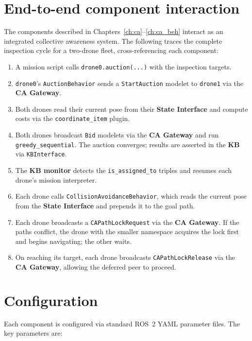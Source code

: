 \documentclass[deliverable]{csreport}
\renewcommand{\code}[1]{\texttt{\textcolor{CSMaroon}{#1}}}%
\begin{document}
\section{End-to-end component interaction}

The components described in Chapters~\ref{ch:ca}--\ref{ch:ca_beh} interact as an integrated collective awareness system. The following traces the complete inspection cycle for a two-drone fleet, cross-referencing each component:

\begin{enumerate}
  \item A mission script calls \code{drone0.auction(...)} with the inspection targets.
  \item \code{drone0}'s \code{AuctionBehavior} sends a \code{StartAuction} modelet to \code{drone1} via the \textbf{CA Gateway}.
  \item Both drones read their current pose from their \textbf{State Interface} and compute costs via the \code{coordinate\_item} plugin.
  \item Both drones broadcast \code{Bid} modelets via the \textbf{CA Gateway} and run \code{greedy\_sequential}. The auction converges; results are asserted in the \textbf{KB} via \code{KBInterface}.
  \item The \textbf{KB monitor} detects the \code{is\_assigned\_to} triples and resumes each drone's mission interpreter.
  \item Each drone calls \code{CollisionAvoidanceBehavior}, which reads the current pose from the \textbf{State Interface} and prepends it to the goal path.
  \item Each drone broadcasts a \code{CAPathLockRequest} via the \textbf{CA Gateway}. If the paths conflict, the drone with the smaller namespace acquires the lock first and begins navigating; the other waits.
  \item On reaching its target, each drone broadcasts \code{CAPathLockRelease} via the \textbf{CA Gateway}, allowing the deferred peer to proceed.
\end{enumerate}

\section{Configuration}

Each component is configured via standard ROS~2 YAML parameter files. The key parameters are:
\end{document}
